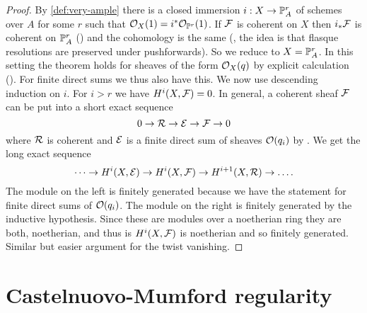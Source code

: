 \begin{proof}
	By \cref{def:very-ample} there is a closed immersion $i: X \to \mathbb{P}^r_A$ of schemes over $A$ for some $r$ such that $\mathcal{O}_X(1) = i^*\mathcal{O}_{\mathbb{P}^r}(1)$. If $\mathcal{F}$ is coherent on $X$ then $i_*\mathcal{F}$ is coherent on $\mathbb{P}^r_A$ (\cite[Exercise II.5.5]{hartshorne2013algebraic}) and the cohomology is the same (\cite[Lemma~III.2.10]{hartshorne2013algebraic}, the idea is that flasque resolutions are preserved under pushforwards). So we reduce to $X = \mathbb{P}^r_A$. In this setting the theorem holds for sheaves of the form $\mathcal{O}_X(q)$ by explicit calculation (\cite[Theorem~II.5.1]{hartshorne2013algebraic}). For finite direct sums we thus also have this. We now use descending induction on $i$. For $i > r$ we have $H^i(X ,\mathcal{F}) = 0$. 
	In general, a coherent sheaf $\mathcal{F}$ can be put into a short exact sequence \[
    	0 \to \mathcal{R} \to \mathcal{E} \to \mathcal{F} \to 0
    \] where $\mathcal{R}$ is coherent and $\mathcal{E}$ is a finite direct sum of sheaves $\mathcal{O}(q_i)$ by \cite[Corollary~II.5.18]{hartshorne2013algebraic}. We get the long exact sequence \[
    	\dots \to H^i(X, \mathcal{E}) \to H^i(X, \mathcal{F}) \to H^{i+1}(X, \mathcal{R}) \to \dots .
    \] The module on the left is finitely generated because we have the statement for finite direct sums of $\mathcal{O}(q_i)$. The module on the right is finitely generated by the inductive hypothesis. Since these are modules over a noetherian ring they are both, noetherian, and thus is $H^i(X, \mathcal{F})$ is noetherian and so finitely generated. Similar but easier argument for the twist vanishing.
\end{proof}

\section{Castelnuovo-Mumford regularity}

